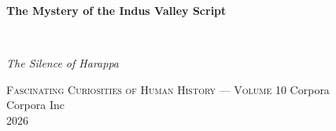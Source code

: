 \clearpage
\vspace*{1.5in}
\begin{center}
  \begin{minipage}{\textwidth}
    \centering
    \Huge\bfseries
    \linespread{1.25}\selectfont
    The Mystery of the Indus Valley Script
  \end{minipage}
  \\[3em]
  {\Large\itshape\linespread{1.3}\selectfont
  The Silence of Harappa\par}
  \vspace{2em}
  {\small\scshape Fascinating Curiosities of Human History — Volume 10}
  \vfill
  {\large Corpora}
  \\[1em]
  {\large Corpora Inc}
  \\[1em]
  {\large 2026}
\end{center}
\clearpage
